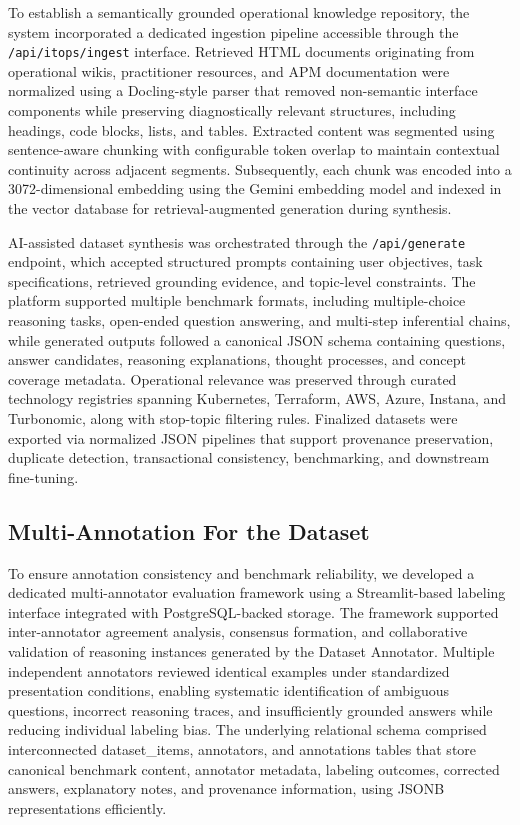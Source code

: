 \documentclass[conference]{IEEEtran}
\begin{document}
To establish a semantically grounded operational knowledge repository, the system incorporated a dedicated ingestion pipeline accessible through the \texttt{/api/itops/ingest} interface. Retrieved HTML documents originating from operational wikis, practitioner resources, and APM documentation were normalized using a Docling-style parser that removed non-semantic interface components while preserving diagnostically relevant structures, including headings, code blocks, lists, and tables. Extracted content was segmented using sentence-aware chunking with configurable token overlap to maintain contextual continuity across adjacent segments. Subsequently, each chunk was encoded into a 3072-dimensional embedding using the Gemini embedding model and indexed in the vector database for retrieval-augmented generation during synthesis.

AI-assisted dataset synthesis was orchestrated through the \texttt{/api/generate} endpoint, which accepted structured prompts containing user objectives, task specifications, retrieved grounding evidence, and topic-level constraints. The platform supported multiple benchmark formats, including multiple-choice reasoning tasks, open-ended question answering, and multi-step inferential chains, while generated outputs followed a canonical JSON schema containing questions, answer candidates, reasoning explanations, thought processes, and concept coverage metadata. Operational relevance was preserved through curated technology registries spanning Kubernetes, Terraform, AWS, Azure, Instana, and Turbonomic, along with stop-topic filtering rules. Finalized datasets were exported via normalized JSON pipelines that support provenance preservation, duplicate detection, transactional consistency, benchmarking, and downstream fine-tuning.

\subsection{Multi-Annotation For the Dataset}

To ensure annotation consistency and benchmark reliability, we developed a dedicated multi-annotator evaluation framework using a Streamlit-based labeling interface integrated with PostgreSQL-backed storage. The framework supported inter-annotator agreement analysis, consensus formation, and collaborative validation of reasoning instances generated by the Dataset Annotator. Multiple independent annotators reviewed identical examples under standardized presentation conditions, enabling systematic identification of ambiguous questions, incorrect reasoning traces, and insufficiently grounded answers while reducing individual labeling bias. The underlying relational schema comprised interconnected dataset\_items, annotators, and annotations tables that store canonical benchmark content, annotator metadata, labeling outcomes, corrected answers, explanatory notes, and provenance information, using JSONB representations efficiently.
\end{document}
